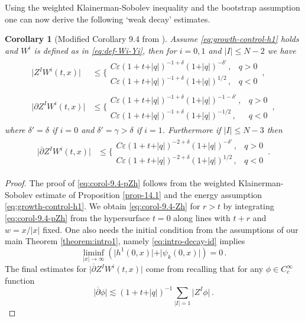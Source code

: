 \documentclass[11pt, a4paper]{amsart}
\numberwithin{equation}{section}
\newtheorem{corollary}[theorem]{Corollary}
\numberwithin{theorem}{section}
\newcommand{\p}{\partial}
\newcommand{\pgood}{\overline{\partial}}
\newcommand{\qv}{\vert q \vert}
\newcommand{\I}{\vert I \vert}
\begin{document}
Using the weighted Klainerman-Sobolev inequality and the bootstrap assumption one can now derive the following `weak decay' estimates. 
\begin{corollary}[Modified Corollary 9.4 from \cite{LR:04}] \label{corol-9.4}
Assume \eqref{eq:growth-control-h1} holds and $W^i$ is defined as in \eqref{eq:def-Wi-Yi}, then for $i=0,1$ and $\I \leq N-2$ we have
\begin{align}
\vert Z^I W^i(t,x) \vert & \leq \Bigg\lbrace \begin{array}{ll}
C \varepsilon (1+t+\qv)^{-1+\delta} (1+\qv)^{-\delta'} \,, & q >0 \\
C \varepsilon (1+t+\qv)^{-1+\delta} (1+\qv)^{1/2} \,, & q <0 
\end{array} \,, \label{eq:corol-9.4-Zh} \\
\vert \p Z^I W^i(t,x) \vert & \leq \Bigg\lbrace \begin{array}{ll}
C \varepsilon (1+t+\qv)^{-1+\delta} (1+\qv)^{-1-\delta'} \,, & q >0 \\
C \varepsilon (1+t+\qv)^{-1+\delta} (1+\qv)^{-1/2} \,, & q <0 
\end{array} \,, \label{eq:corol-9.4-pZh}
\end{align}
where $\delta'=\delta$ if $i=0$ and $\delta'=\gamma > \delta$ if $i=1$.
Furthermore if $\I \leq N-3$ then
\begin{align}
\vert \pgood Z^I W^i(t,x) \vert & \leq \Bigg\lbrace \begin{array}{ll}
C \varepsilon (1+t+\qv)^{-2+\delta} (1+\qv)^{-\delta'} \,, & q >0 \\
C \varepsilon (1+t+\qv)^{-2+\delta} (1+\qv)^{1/2} \,, & q <0 
\end{array} \,. \label{eq:corol-9.4-pgoodZh}
\end{align}
\end{corollary}  
\begin{proof}
The proof of \eqref{eq:corol-9.4-pZh} follows from the weighted Klainerman-Sobolev estimate of Proposition \ref{prop-14.1} and the energy assumption  \eqref{eq:growth-control-h1}. We obtain \eqref{eq:corol-9.4-Zh} for $r>t$  by integrating \eqref{eq:corol-9.4-pZh} from the hypersurface $t=0$ along lines with $t+r$ and $w = x/\vert x \vert$ fixed. One also needs the initial condition from the assumptions of our main Theorem \ref{theorem:intro1}, namely \eqref{eq:intro-decay-id} implies
$$ \liminf_{\vert x \vert \to \infty} \left( \vert h^1(0,x) \vert + \vert \psi_k(0,x) \vert \right) = 0 \,. $$
The final estimates for $\vert \pgood Z^I W^i(t,x) \vert$ come from recalling that for any $\phi \in C^\infty_c$ function
$$\vert \pgood \phi \vert \lesssim (1+t+\qv)^{-1}  \sum_{\I = 1} \vert Z^I \phi \vert \,.$$
\end{proof}
\end{document}
